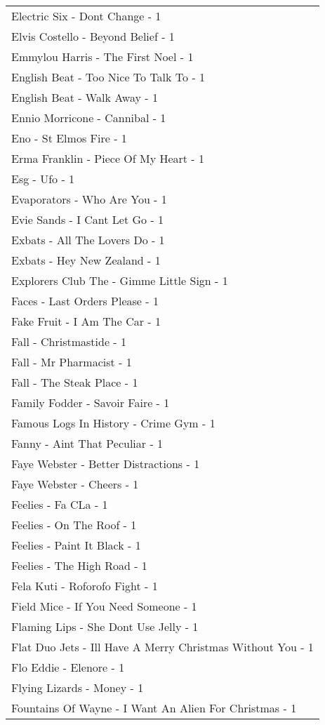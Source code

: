\documentclass[
]{article}
\begin{document}
\begin{longtable}{l}
Electric Six - Dont Change - 1 \\ 
Elvis Costello - Beyond Belief - 1 \\ 
Emmylou Harris - The First Noel - 1 \\ 
English Beat - Too Nice To Talk To - 1 \\ 
English Beat - Walk Away - 1 \\ 
Ennio Morricone - Cannibal - 1 \\ 
Eno - St Elmos Fire - 1 \\ 
Erma Franklin - Piece Of My Heart - 1 \\ 
Esg - Ufo - 1 \\ 
Evaporators - Who Are You - 1 \\ 
Evie Sands - I Cant Let Go - 1 \\ 
Exbats - All The Lovers Do - 1 \\ 
Exbats - Hey New Zealand - 1 \\ 
Explorers Club The - Gimme Little Sign - 1 \\ 
Faces - Last Orders Please - 1 \\ 
Fake Fruit - I Am The Car - 1 \\ 
Fall - Christmastide - 1 \\ 
Fall - Mr Pharmacist - 1 \\ 
Fall - The Steak Place - 1 \\ 
Family Fodder - Savoir Faire - 1 \\ 
Famous Logs In History - Crime Gym - 1 \\ 
Fanny - Aint That Peculiar - 1 \\ 
Faye Webster - Better Distractions - 1 \\ 
Faye Webster - Cheers - 1 \\ 
Feelies - Fa CLa - 1 \\ 
Feelies - On The Roof - 1 \\ 
Feelies - Paint It Black - 1 \\ 
Feelies - The High Road - 1 \\ 
Fela Kuti - Roforofo Fight - 1 \\ 
Field Mice - If You Need Someone - 1 \\ 
Flaming Lips - She Dont Use Jelly - 1 \\ 
Flat Duo Jets - Ill Have A Merry Christmas Without You - 1 \\ 
Flo Eddie - Elenore - 1 \\ 
Flying Lizards - Money - 1 \\ 
Fountains Of Wayne - I Want An Alien For Christmas - 1 \\ 

\end{longtable}
\end{document}
